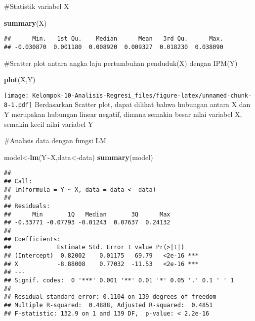 \documentclass[
]{article}
\newenvironment{Shaded}{\begin{snugshade}}{\end{snugshade}}
\newcommand{\FunctionTok}[1]{\textcolor[rgb]{0.13,0.29,0.53}{\textbf{#1}}}
\newcommand{\NormalTok}[1]{#1}
\newcommand{\OtherTok}[1]{\textcolor[rgb]{0.56,0.35,0.01}{#1}}
\newcommand{\SpecialCharTok}[1]{\textcolor[rgb]{0.81,0.36,0.00}{\textbf{#1}}}
\begin{document}
\#Statistik variabel X

\begin{Shaded}
\begin{Highlighting}[]
\FunctionTok{summary}\NormalTok{(X)}
\end{Highlighting}
\end{Shaded}

\begin{verbatim}
##      Min.   1st Qu.    Median      Mean   3rd Qu.      Max. 
## -0.030870  0.001180  0.008920  0.009327  0.018230  0.038090
\end{verbatim}

\#Scatter plot antara angka laju pertumbuhan penduduk(X) dengan IPM(Y)

\begin{Shaded}
\begin{Highlighting}[]
\FunctionTok{plot}\NormalTok{(X,Y)}
\end{Highlighting}
\end{Shaded}

\texttt{[image: Kelompok-10-Analisis-Regresi\_files/figure-latex/unnamed-chunk-8-1.pdf]}
Berdasarkan Scatter plot, dapat dilihat bahwa hubungan antara X dan Y
merupakan hubungan linear negatif, dimana semakin besar nilai variabel
X, semakin kecil nilai variabel Y

\#Analisis data dengan fungsi LM

\begin{Shaded}
\begin{Highlighting}[]
\NormalTok{model}\OtherTok{\textless{}{-}}\FunctionTok{lm}\NormalTok{(Y}\SpecialCharTok{\textasciitilde{}}\NormalTok{X,data}\OtherTok{\textless{}{-}}\NormalTok{data)}
\FunctionTok{summary}\NormalTok{(model)}
\end{Highlighting}
\end{Shaded}

\begin{verbatim}
## 
## Call:
## lm(formula = Y ~ X, data = data <- data)
## 
## Residuals:
##      Min       1Q   Median       3Q      Max 
## -0.33771 -0.07793 -0.01243  0.07637  0.24132 
## 
## Coefficients:
##             Estimate Std. Error t value Pr(>|t|)    
## (Intercept)  0.82002    0.01175   69.79   <2e-16 ***
## X           -8.88008    0.77032  -11.53   <2e-16 ***
## ---
## Signif. codes:  0 '***' 0.001 '**' 0.01 '*' 0.05 '.' 0.1 ' ' 1
## 
## Residual standard error: 0.1104 on 139 degrees of freedom
## Multiple R-squared:  0.4888, Adjusted R-squared:  0.4851 
## F-statistic: 132.9 on 1 and 139 DF,  p-value: < 2.2e-16
\end{verbatim}
\end{document}
